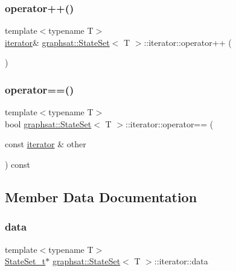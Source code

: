 \subsubsection{\texorpdfstring{operator++()}{operator++()}}
{\footnotesize\ttfamily template$<$typename T$>$ \\
\mbox{\hyperlink{classgraphsat_1_1_state_set_1_1iterator}{iterator}}\& \mbox{\hyperlink{classgraphsat_1_1_state_set}{graphsat\+::\+State\+Set}}$<$ T $>$\+::iterator\+::operator++ (\begin{DoxyParamCaption}{ }\end{DoxyParamCaption})\hspace{0.3cm}{\ttfamily [inline]}}

\mbox{\label{classgraphsat_1_1_state_set_1_1iterator_a844e07cabc180b39987d21961753c7d6}} 
\subsubsection{\texorpdfstring{operator==()}{operator==()}}
{\footnotesize\ttfamily template$<$typename T$>$ \\
bool \mbox{\hyperlink{classgraphsat_1_1_state_set}{graphsat\+::\+State\+Set}}$<$ T $>$\+::iterator\+::operator== (\begin{DoxyParamCaption}\item[{const \mbox{\hyperlink{classgraphsat_1_1_state_set_1_1iterator}{iterator}} \&}]{other }\end{DoxyParamCaption}) const\hspace{0.3cm}{\ttfamily [inline]}}



\subsection{Member Data Documentation}
\mbox{\label{classgraphsat_1_1_state_set_1_1iterator_a0de5b07e95480dc478026ebfcc894cce}} 
\subsubsection{\texorpdfstring{data}{data}}
{\footnotesize\ttfamily template$<$typename T$>$ \\
\mbox{\hyperlink{classgraphsat_1_1_state_set_a6474a59203fade7146aacfd0e277ecf4}{State\+Set\+\_\+t}}$\ast$ \mbox{\hyperlink{classgraphsat_1_1_state_set}{graphsat\+::\+State\+Set}}$<$ T $>$\+::iterator\+::data\hspace{0.3cm}{\ttfamily [protected]}}

